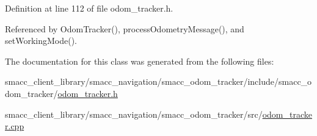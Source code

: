Definition at line 112 of file odom\+\_\+tracker.\+h.



Referenced by Odom\+Tracker(), process\+Odometry\+Message(), and set\+Working\+Mode().



The documentation for this class was generated from the following files\+:\begin{DoxyCompactItemize}
\item 
smacc\+\_\+client\+\_\+library/smacc\+\_\+navigation/smacc\+\_\+odom\+\_\+tracker/include/smacc\+\_\+odom\+\_\+tracker/\hyperlink{odom__tracker_8h}{odom\+\_\+tracker.\+h}\item 
smacc\+\_\+client\+\_\+library/smacc\+\_\+navigation/smacc\+\_\+odom\+\_\+tracker/src/\hyperlink{odom__tracker_8cpp}{odom\+\_\+tracker.\+cpp}\end{DoxyCompactItemize}
